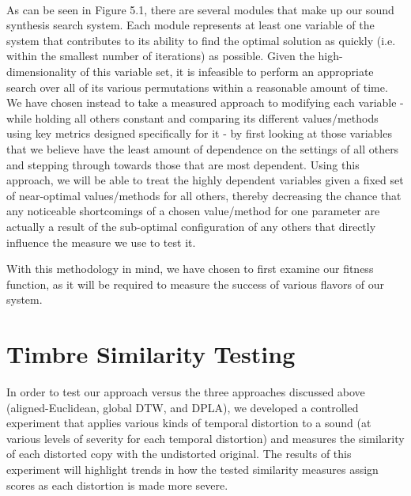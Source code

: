 \documentclass[a4paper,12pt]{report} 	%
\numberwithin{figure}{chapter}
\numberwithin{table}{chapter}
\numberwithin{equation}{chapter}
\begin{document}
\begin{flushleft}
\begin{figure}[h!]
\end{figure}
\\
As can be seen in Figure 5.1, there are several modules that make up our sound synthesis search system. Each module represents at least one variable of the system that contributes to its ability to find the optimal solution as quickly (i.e. within the smallest number of iterations) as possible. Given the high-dimensionality of this variable set, it is infeasible to perform an appropriate search over all of its various permutations within a reasonable amount of time. We have chosen instead to take a measured approach to modifying each variable - while holding all others constant and comparing its different values/methods using key metrics designed specifically for it - by first looking at those variables that we believe have the least amount of dependence on the settings of all others and stepping through towards those that are most dependent. Using this approach, we will be able to treat the highly dependent variables given a fixed set of near-optimal values/methods for all others, thereby decreasing the chance that any noticeable shortcomings of a chosen value/method for one parameter are actually a result of the sub-optimal configuration of any others that directly influence the measure we use to test it.

With this methodology in mind, we have chosen to first examine our fitness function, as it will be required to measure the success of various flavors of our system.

\section{Timbre Similarity Testing}
In order to test our approach versus the three approaches discussed above (aligned-Euclidean, global DTW, and DPLA), we developed a controlled experiment that applies various kinds of temporal distortion to a sound (at various levels of severity for each temporal distortion) and measures the similarity of each distorted copy with the undistorted original. The results of this experiment will highlight trends in how the tested similarity measures assign scores as each distortion is made more severe.


\end{flushleft}
\end{document}
